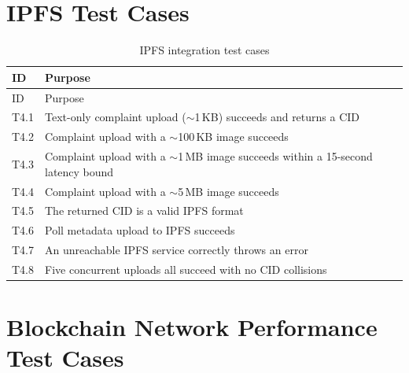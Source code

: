 \section{IPFS Test Cases}
\label{apndx:ipfs-test-suite}

\begin{longtable}{p{}|p{}}
\caption{IPFS integration test cases} \\

  {ID} &   {Purpose} \\
\hline
\endfirsthead
\hline
  {ID} &   {Purpose} \\
\hline
\endhead
T4.1 & Text-only complaint upload ($\sim$1\,KB) succeeds and returns a CID \\
\hline
T4.2 & Complaint upload with a $\sim$100\,KB image succeeds \\
\hline
T4.3 & Complaint upload with a $\sim$1\,MB image succeeds within a 15-second latency bound \\
\hline
T4.4 & Complaint upload with a $\sim$5\,MB image succeeds \\
\hline
T4.5 & The returned CID is a valid IPFS format \\
\hline
T4.6 & Poll metadata upload to IPFS succeeds \\
\hline
T4.7 & An unreachable IPFS service correctly throws an error \\
\hline
T4.8 & Five concurrent uploads all succeed with no CID collisions \\

\end{longtable}


\section{Blockchain Network Performance Test Cases}
\label{apndx:blockchain-performance-test-cases}
 
